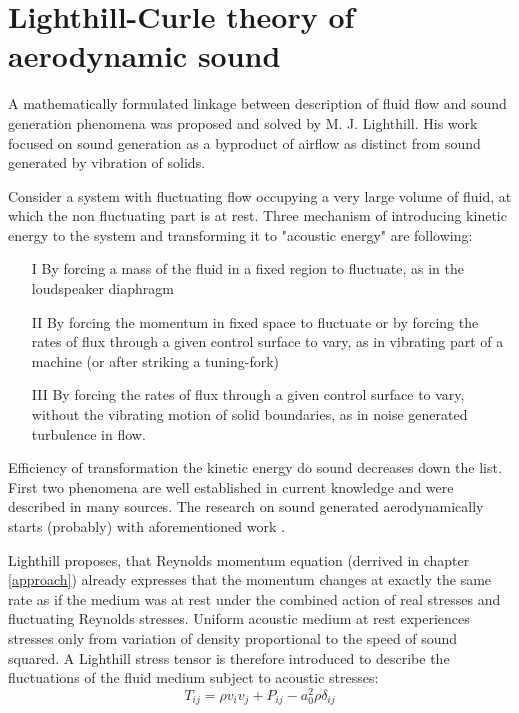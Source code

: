 \section{Lighthill-Curle theory of aerodynamic sound}
A mathematically formulated linkage between description of fluid flow and sound generation phenomena was proposed and solved by M. J. Lighthill.  His work \citep{Light1} focused on sound generation as a byproduct of airflow as distinct from sound generated by vibration of solids.

Consider a system with fluctuating flow occupying a very large volume of fluid, at which the non fluctuating part is at rest. Three mechanism of introducing kinetic energy to the system and transforming it to "acoustic energy" are following:

\begin{itemize}
\item[I] By forcing a mass of the fluid in a fixed region to fluctuate, as in the loudspeaker diaphragm
\item[II] By forcing the momentum in fixed space to fluctuate or by forcing the rates of flux through a given control surface to vary, as in vibrating part of a machine (or after striking a tuning-fork)
\item[III] By forcing the rates of flux through a given control surface to vary, without the vibrating motion of solid boundaries, as in noise generated turbulence in flow.
\end{itemize}

Efficiency of transformation the kinetic energy do sound decreases down the list. First two phenomena are well established in current knowledge and were described in many sources. The research on sound generated aerodynamically starts (probably) with aforementioned work \citep{Light2}.

Lighthill proposes, that Reynolds momentum equation (derrived in chapter \ref{approach}) already expresses that the momentum changes at exactly the same rate as if the medium was at rest under the combined action of real stresses and fluctuating Reynolds stresses. Uniform acoustic medium at rest experiences stresses only from variation of density proportional to the speed of sound squared. A Lighthill stress tensor is therefore introduced to describe the fluctuations of the fluid medium subject to acoustic stresses:
\begin{equation} \label{eq:lighttensor}
T_{ij} = \rho v_i v_j + P_{ij} - a_0^2 \rho \delta_{ij}
\end{equation}

